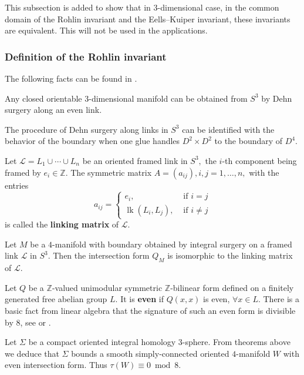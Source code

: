 \documentclass[twoside]{article}
\begin{document}
This subsection is added to show that in $3$-dimensional case, in the common domain of the Rohlin invariant and the Eells--Kuiper invariant, these invariants are equivalent. This will not be used in the applications. 

\subsubsection{Definition of the Rohlin invariant}

The following facts can be found in \cite{saveliev}. 

\begin{thm}
	Any closed orientable $3$-dimensional manifold can be obtained from $S^3$ by Dehn surgery along an even link.
\end{thm}

The procedure of Dehn surgery along links in $S^3$ can be identified with the behavior of the boundary when one glue handles $D^2 \times  D^2$ to the boundary of $D^4$. 

Let $\mathscr{L} = L_{1}   \cup   \cdots   \cup   L_{n}$ be an oriented framed link in $S^{3},$ the $i$-th component being framed by $e_{i}  \in   \mathbb{Z} .$ The symmetric matrix $A = \left(a_{i j}\right), i, j = 1, \ldots, n,$ with the entries
\[
a_{i j} = \left \{ 
\begin{array}{ll}
e_{i}, & \text { if } i = j \\
\operatorname{lk}\left(L_{i}, L_{j}\right), & \text { if } i          \neq   j
\end{array}\right. 
\]
is called the \textbf{linking matrix} of $\mathscr{L}$. 

\begin{thm}
	Let $M$ be a $4$-manifold with boundary obtained by integral surgery on a framed link $\mathscr{L}$ in $S^3$. Then the intersection form $Q_M$ is isomorphic to the linking matrix of $\mathscr{L}$. 
\end{thm}

Let $Q$ be a $\mathbb{Z}$-valued unimodular symmetric $\mathbb{Z}$-bilinear form defined on a finitely generated free abelian group $L$. It is \textbf{even} if $Q(x,x)$ is even, $\forall x\in L$. There is a basic fact from linear algebra that the signature of such an even form is divisible by $8$, see \cite{serre} or \cite{milnorsymmetric}. 




Let $\Sigma$ be a compact oriented integral homology $3$-sphere. From  theorems above we deduce that $\Sigma$ bounds  a smooth simply-connected oriented $4$-manifold $W$ with even intersection form. Thus $\tau(W) \equiv  0\bmod 8$. 
\end{document}
